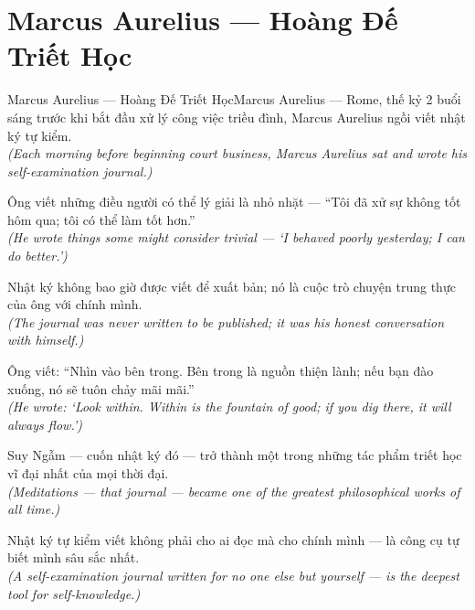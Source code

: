 \section{Marcus Aurelius --- Hoàng Đế Triết Học}
\begin{truyen}{Marcus Aurelius --- Hoàng Đế Triết Học}{Marcus Aurelius --- Rome, thế kỷ 2}
 buổi sáng trước khi bắt đầu xử lý công việc triều đình, Marcus Aurelius ngồi viết nhật ký tự kiểm.\\[4pt]
\textit{(Each morning before beginning court business, Marcus Aurelius sat and wrote his self-examination journal.)}

Ông viết những điều người có thể lý giải là nhỏ nhặt --- ``Tôi đã xử sự không tốt hôm qua; tôi có thể làm tốt hơn.''\\[4pt]
\textit{(He wrote things some might consider trivial --- `I behaved poorly yesterday; I can do better.')}

Nhật ký không bao giờ được viết để xuất bản; nó là cuộc trò chuyện trung thực của ông với chính mình.\\[4pt]
\textit{(The journal was never written to be published; it was his honest conversation with himself.)}

Ông viết: ``Nhìn vào bên trong. Bên trong là nguồn thiện lành; nếu bạn đào xuống, nó sẽ tuôn chảy mãi mãi.''\\[4pt]
\textit{(He wrote: `Look within. Within is the fountain of good; if you dig there, it will always flow.')}

Suy Ngẫm --- cuốn nhật ký đó --- trở thành một trong những tác phẩm triết học vĩ đại nhất của mọi thời đại.\\[4pt]
\textit{(Meditations --- that journal --- became one of the greatest philosophical works of all time.)}

\end{truyen}
\begin{baihoc}
  Nhật ký tự kiểm viết không phải cho ai đọc mà cho chính mình --- là công cụ tự biết mình sâu sắc nhất.\\[4pt]
  \textit{(A self-examination journal written for no one else but yourself --- is the deepest tool for self-knowledge.)}
\end{baihoc}

